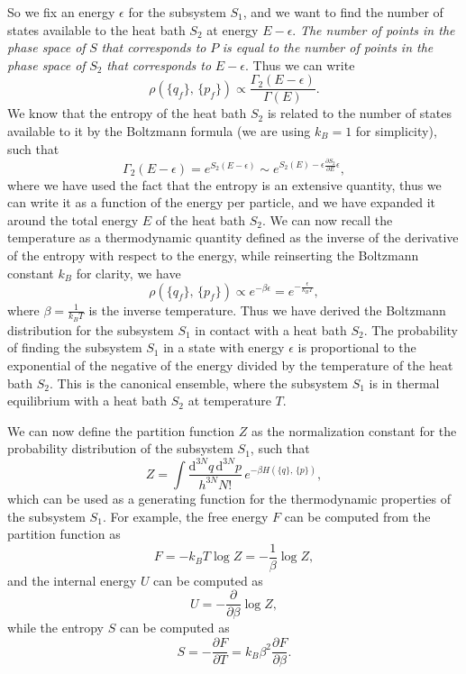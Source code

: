 So we fix an energy \(\epsilon\) for the subsystem \(S_1\), and we want to find the number of states available to the heat bath \(S_2\) at energy \(E - \epsilon\). \textit{The number of points in the phase space of} \(S\) \textit{that corresponds to} \(P\) \textit{is equal to the number of points in the phase space of} \(S_2\) \textit{that corresponds to} \(E - \epsilon\). Thus we can write
\[
    \rho(\{q_f\},\,\{p_f\}) \propto \frac{\Gamma_2(E - \epsilon)}{\Gamma(E)}.
\]
We know that the entropy of the heat bath \(S_2\) is related to the number of states available to it by the Boltzmann formula (we are using \(k_B=1\) for simplicity), such that
\[
    \Gamma_2(E - \epsilon) = e^{S_2(E - \epsilon)} \sim e^{S_2(E) - \epsilon \frac{\partial S_2}{\partial E} \epsilon},
\]
where we have used the fact that the entropy is an extensive quantity, thus we can write it as a function of the energy per particle, and we have expanded it around the total energy \(E\) of the heat bath \(S_2\). We can now recall the temperature as a thermodynamic quantity defined as the inverse of the derivative of the entropy with respect to the energy, while reinserting the Boltzmann constant \(k_B\) for clarity, we have
\[
    \rho(\{q_f\},\,\{p_f\}) \propto e^{-\beta \epsilon} = e^{- \frac{\epsilon}{k_B T}},
\]
where \(\beta = \frac{1}{k_B T}\) is the inverse temperature. Thus we have derived the Boltzmann distribution for the subsystem \(S_1\) in contact with a heat bath \(S_2\). The probability of finding the subsystem \(S_1\) in a state with energy \(\epsilon\) is proportional to the exponential of the negative of the energy divided by the temperature of the heat bath \(S_2\). This is the canonical ensemble, where the subsystem \(S_1\) is in thermal equilibrium with a heat bath \(S_2\) at temperature \(T\).

We can now define the partition function \(Z\) as the normalization constant for the probability distribution of the subsystem \(S_1\), such that
\[
    Z = \int \frac{\mathrm{d}^{3N}q \, \mathrm{d}^{3N}p}{h^{3N}N!} \, e^{-\beta H(\{q\},\,\{p\})},
\]
which can be used as a generating function for the thermodynamic properties of the subsystem \(S_1\). For example, the free energy \(F\) can be computed from the partition function as
\[
    F = -k_B T \log Z = -\frac{1}{\beta} \log Z,
\]
and the internal energy \(U\) can be computed as
\[
    U = -\frac{\partial}{\partial \beta} \log Z,
\]
while the entropy \(S\) can be computed as
\[
    S = -\frac{\partial F}{\partial T} = k_B \beta^2 \frac{\partial F}{\partial \beta}.
\]

